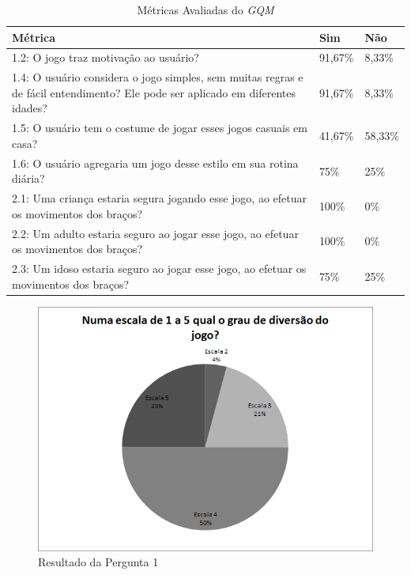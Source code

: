 \begin{table}[h]
\caption{Métricas Avaliadas do \textit{GQM}}
\centering
\begin{tabular}{|p{10cm}|p{1.2cm}|p{1.2cm}|}
\hline
\textbf{Métrica} & \textbf{Sim} & \textbf{Não} \\ \hline
1.2: O jogo traz motivação ao usuário? & 91,67\% & 8,33\% \\ \hline
1.4: O usuário considera o jogo simples, sem muitas regras e de fácil entendimento? Ele pode ser aplicado em diferentes idades? & 91,67\% & 8,33\% \\ \hline
1.5: O usuário tem o costume de jogar esses jogos casuais em casa? & 41,67\% & 58,33\% \\ \hline
1.6: O usuário agregaria um jogo desse estilo em sua rotina diária? & 75\% & 25\% \\ \hline
2.1: Uma criança estaria segura jogando esse jogo, ao efetuar os movimentos dos braços? & 100\% & 0\% \\ \hline
2.2: Um adulto estaria seguro ao jogar esse jogo, ao efetuar os movimentos dos braços? & 100\% & 0\% \\ \hline
2.3: Um idoso estaria seguro ao jogar esse jogo, ao efetuar os movimentos dos braços? & 75\% & 25\% \\ \hline
\end{tabular}
\label{table:resultados_gqm}
\end{table}


\begin{figure}[!htb]
     \centering
     \includegraphics[scale=0.7]{./img/chart_1-.png}
     \caption{Resultado da Pergunta 1}
     \label{fig:question1}
\end{figure}


